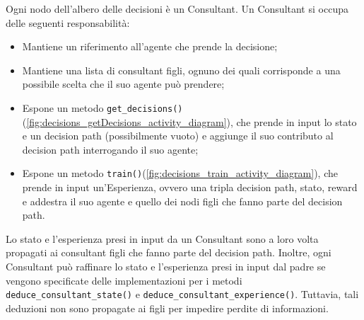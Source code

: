 \documentclass[conference]{IEEEtran}
\newcommand{\code}[1]{\texttt{#1}}
\begin{document}
Ogni nodo dell'albero delle decisioni è un Consultant. Un Consultant si occupa
delle seguenti responsabilità:
\begin{itemize}
    \item Mantiene un riferimento all'agente che prende la decisione;
    \item Mantiene una lista di consultant figli, ognuno dei quali corrisponde
    a una possibile scelta che il suo agente può prendere;
    \item Espone un metodo \code{get\_decisions()}(\autoref{fig:decisions_getDecisions_activity_diagram}), che prende in input
    lo stato e un decision path (possibilmente vuoto) e aggiunge il suo contributo
    al decision path interrogando il suo agente;
    \item Espone un metodo \code{train()}(\autoref{fig:decisions_train_activity_diagram}), che prende in input un'Esperienza,
    ovvero una tripla
    decision path, stato, reward e addestra il suo agente e quello dei nodi
    figli che fanno parte del decision path.
\end{itemize}
Lo stato e l'esperienza presi in input da un Consultant sono a loro volta
propagati ai consultant figli che fanno parte del decision path. Inoltre,
ogni Consultant può raffinare lo stato e l'esperienza presi in input dal padre
se vengono specificate delle implementazioni per i metodi \code{deduce\_consultant\_state()}
e \code{deduce\_consultant\_experience()}. Tuttavia, tali deduzioni non sono propagate ai figli
per impedire perdite di informazioni. 
\end{document}
